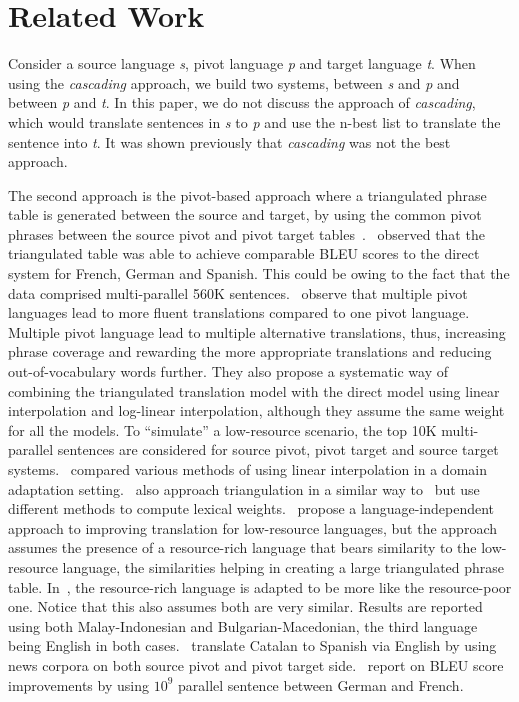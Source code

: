 \documentclass[11pt]{article}
\begin{document}
	

\section{Related Work}
Consider a source language \emph{s}, pivot language \emph{p} and target language \emph{t}. When using the \emph{cascading} approach, we build two systems, between \emph{s} and \emph{p} and between \emph{p} and \emph{t}. In this paper, we do not discuss the approach of \emph{cascading}, which would translate sentences in \emph{s} to \emph{p} and use the n-best list to translate the sentence into \emph{t}. It was shown previously \cite{Utiyama:07,Gispert:06} that \emph{cascading} was not the best approach. 

The second approach is the pivot-based approach where a triangulated phrase table is generated between the source and target, by using the common pivot phrases between the source pivot and pivot target tables~\cite{Utiyama:07,Cohn:07,Wuwang:07}.~\cite{Utiyama:07} observed that the triangulated table was able to achieve comparable BLEU scores to the direct system for French, German and Spanish. This could be owing to the fact that the data comprised multi-parallel 560K sentences.~\cite{Cohn:07} observe that multiple pivot languages lead to more fluent translations compared to one pivot language. Multiple pivot language lead to multiple alternative translations, thus, increasing phrase coverage and rewarding the more appropriate translations and reducing out-of-vocabulary words further. They also propose a systematic way of combining the triangulated translation model with the direct model using linear interpolation and log-linear interpolation, although they assume the same weight for all the models. To ``simulate'' a low-resource scenario, the top 10K multi-parallel sentences are considered for source pivot, pivot target and source target systems.~\cite{Sennrich:2012} compared various methods of using linear interpolation in a domain adaptation setting.~\cite{Wuwang:07} also approach triangulation in a similar way to~\cite{Cohn:07} but use different methods to compute lexical weights.~\cite{Nakov:12} propose a language-independent approach to improving translation for low-resource languages, but the approach assumes the presence of a resource-rich language that bears similarity to the low-resource language, the similarities helping in creating a large triangulated phrase table. In~\cite{Nakovemnlp:12}, the resource-rich language is adapted to be more like the resource-poor one. Notice that this also assumes both are very similar. Results are reported using both Malay-Indonesian and Bulgarian-Macedonian, the third language being English in both cases.~\cite{Gispert:06} translate Catalan to Spanish via English by using news corpora on both source pivot and pivot target side.~\cite{Huck:12} report on BLEU score improvements by using $10^9$ parallel sentence between German and French.
\end{document}
